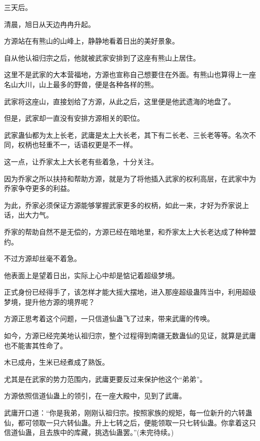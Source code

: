 \begin{this_body}
三天后。

清晨，旭日从天边冉冉升起。

方源站在有熊山的山峰上，静静地看着日出的美好景象。

自从他认祖归宗之后，他就被武家安排到了这座有熊山上居住。

这里不是武家的大本营福地，方源也宣称自己想要住在外面。有熊山也算得上一座名山大川，山上最多的野兽，便是各种各样的熊。

武家将这座山，直接划给了方源，从此之后，这里便是他武遗海的地盘了。

但是，武家却一直没有安排方源相关的职位。

武家蛊仙都为太上长老，武庸是太上大长老，其下有二长老、三长老等等。名次不同，权柄也轻重不一，话语权更是不一样。

这一点，让乔家太上大长老有些着急，十分关注。

因为乔家之所以扶持和帮助方源，就是为了将他插入武家的权利高层，在武家中为乔家争夺更多的利益。

为此，乔家必须保证方源能够掌握武家更多的权柄，如此一来，才好为乔家说上话，出大力气。

乔家的帮助自然不是无偿的，方源已经在暗地里，和乔家太上大长老达成了种种盟约。

不过方源却丝毫不着急。

他表面上是望着日出，实际上心中却是惦记着超级梦境。

正式身份已经得手了，该怎样才能大摇大摆地，进入那座超级蛊阵当中，利用超级梦境，提升他方源的境界呢？

方源正思考着这个问题，一只信道仙蛊飞了过来，带来武庸的传唤。

如今，方源已经完美地认祖归宗，整个过程得到南疆无数蛊仙的见证，就算是武庸也不能害其性命了。

木已成舟，生米已经煮成了熟饭。

尤其是在武家的势力范围内，武庸更要反过来保护他这个“弟弟”。

方源依照信道仙蛊上的领引，在一座大殿中，见到了武庸。

武庸开口道：“你是我弟，刚刚认祖归宗。按照家族的规矩，每一位新升的六转蛊仙，都可领取一只六转仙蛊。升上七转之后，便能领取一只七转仙蛊。你拿着这只信道仙蛊，且去族中的库藏，挑选仙蛊罢。”(未完待续。)

\end{this_body}

